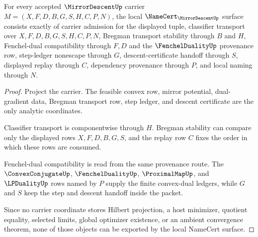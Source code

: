 \begin{theorem}
\label{thm:mirror-descent-namecert-obligations}
For every accepted $\MirrorDescentUp$ carrier $M=(X,F,D,B,G,S,H,C,P,N)$, the local $\NameCert_{\MirrorDescentUp}$ surface consists exactly of carrier admission for the displayed tuple, classifier transport over $X,F,D,B,G,S,H,C,P,N$, Bregman transport stability through $B$ and $H$, Fenchel-dual compatibility through $F,D$ and the $\FenchelDualityUp$ provenance row, step-ledger nonescape through $G$, descent-certificate handoff through $S$, displayed replay through $C$, dependency provenance through $P$, and local naming through $N$.
\end{theorem}
\begin{proof}
Project the carrier. The feasible convex row, mirror potential, dual-gradient data, Bregman transport row, step ledger, and descent certificate are the only analytic coordinates.

Classifier transport is componentwise through $H$. Bregman stability can compare only the displayed rows $X,F,D,B,G,S$, and the replay row $C$ fixes the order in which these rows are consumed.

Fenchel-dual compatibility is read from the same provenance route. The $\ConvexConjugateUp$, $\FenchelDualityUp$, $\ProximalMapUp$, and $\LPDualityUp$ rows named by $P$ supply the finite convex-dual ledgers, while $G$ and $S$ keep the step and descent handoff inside the packet.

Since no carrier coordinate stores Hilbert projection, a host minimizer, quotient equality, selected limits, global optimizer existence, or an ambient convergence theorem, none of those objects can be exported by the local NameCert surface.
\end{proof}


